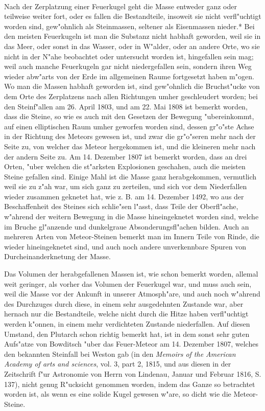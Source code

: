 \documentclass[a4paper, 11pt, oneside, polutonikogreek, german]{article}
\begin{document}
\paragraph{}
Nach der Zerplatzung einer Feuerkugel geht die Masse entweder ganz oder teilweise weiter fort, oder es fallen die Bestandteile, insoweit sie nicht verfl"uchtigt worden sind, gew"ohnlich als Steinmassen, seltener als Eisenmassen nieder.* Bei den meisten Feuerkugeln ist man die Substanz nicht habhaft geworden, weil sie in das Meer, oder sonst in das Wasser, oder in W"alder, oder an andere Orte, wo sie nicht in der N"ahe beobachtet oder untersucht worden ist, hingefallen sein mag; weil auch manche Feuerkugeln gar nicht niedergefallen sein, sondern ihren Weg wieder abw"arts von der Erde im allgemeinen Raume fortgesetzt haben m"ogen. Wo man die Massen habhaft geworden ist, sind gew"ohnlich die Bruchst"ucke von dem Orte des Zerplatzens nach allen Richtungen umher geschleudert worden; bei den Steinf"allen am 26. April 1803, und am 22. Mai 1808 ist bemerkt worden, dass die Steine, so wie es auch mit den Gesetzen der Bewegung "ubereinkommt, auf einen elliptischen Raum umher geworfen worden sind, dessen gr"o"ste Achse in der Richtung des Meteors gewesen ist, und zwar die gr"o"seren mehr nach der Seite zu, von welcher das Meteor hergekommen ist, und die kleineren mehr nach der andern Seite zu. Am 14. Dezember 1807 ist bemerkt worden, dass an drei Orten, "uber welchen die st"arksten Explosionen geschahen, auch die meisten Steine gefallen sind. Einige Mahl ist die Masse ganz herabgekommen, vermutlich weil sie zu z"ah war, um sich ganz zu zerteilen, und sich vor dem Niederfallen wieder zusammen geknetet hat, wie z. B. am 14. Dezember 1492, wo aus der Beschaffenheit des Steines sich schlie"sen l"asst, dass Teile der Oberfl"ache, w"ahrend der weitern Bewegung in die Masse hineingeknetet worden sind, welche im Bruche gl"anzende und dunkelgraue Absonderungsfl"achen bilden. Auch an mehreren Arten von Meteor-Steinen bemerkt man im Innern Teile von Rinde, die wieder hineingeknetet sind, und auch noch andere unverkennbare Spuren von Durcheinanderknetung der Masse.

Das Volumen der herabgefallenen Massen ist, wie schon bemerkt worden, allemal weit geringer, als vorher das Volumen der Feuerkugel war, und muss auch sein, weil die Masse vor der Ankunft in unserer Atmosph"are, und auch noch w"ahrend des Durchzuges durch diese, in einem sehr ausgedehnten Zustande war, aber hernach nur die Bestandteile, welche nicht durch die Hitze haben verfl"uchtigt werden k"onnen, in einem mehr verdichteten Zustande niederfallen. Auf diesen Umstand, den Plutarch schon richtig bemerkt hat, ist in dem sonst sehr guten Aufs"atze von Bowditsch "uber das Feuer-Meteor am 14. Dezember 1807, welches den bekannten Steinfall bei Weston gab (in den \emph{Memoirs of the American Academy of arts and sciences}, vol. 3, part 2, 1815, und aus diesen in der Zeitschrift f"ur Astronomie von Herrn von Lindenau, Januar und Februar 1816, S. 137), nicht genug R"ucksicht genommen worden, indem das Ganze so betrachtet worden ist, als wenn es eine solide Kugel gewesen w"are, so dicht wie die Meteor-Steine.
\end{document}
